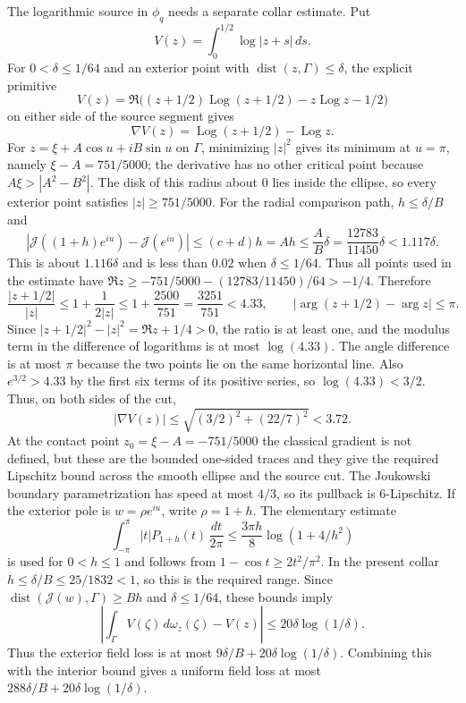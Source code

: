 The logarithmic source in $\phi_q$ needs a separate collar estimate.  Put
\[
 V(z)=\int_0^{1/2}\log|z+s|\,ds.
\]
For $0<\delta\le1/64$ and an exterior point with
$\operatorname{dist}(z,\Gamma)\le\delta$, the explicit primitive
\[
 V(z)=\Re\bigl((z+1/2)\operatorname{Log}(z+1/2)
              -z\operatorname{Log}z-1/2\bigr)
\]
on either side of the source segment gives
\[
 \nabla V(z)=\operatorname{Log}(z+1/2)-\operatorname{Log}z.
\]
For $z=\xi+A\cos u+iB\sin u$ on $\Gamma$, minimizing
$|z|^2$ gives its minimum at $u=\pi$, namely
$\xi-A=751/5000$; the derivative has no other critical point because
$A\xi>|A^2-B^2|$.  The disk of this radius about $0$ lies inside the ellipse,
so every exterior point satisfies $|z|\ge751/5000$.  For the radial
comparison path, $h\le\delta/B$ and
\[
 |\mathcal J((1+h)e^{iu})-\mathcal J(e^{iu})|
 \le(c+d)h=Ah\le\frac AB\delta
 =\frac{12783}{11450}\delta<1.117\delta.
\]
This is about $1.116\delta$ and is less than $0.02$ when
$\delta\le1/64$.  Thus all points used in the estimate have
$\Re z\ge-751/5000-(12783/11450)/64>-1/4$.  Therefore
\[
 \frac{|z+1/2|}{|z|}
 \le1+\frac1{2|z|}
 \le1+\frac{2500}{751}
 =\frac{3251}{751}<4.33,
 \qquad
 |\arg(z+1/2)-\arg z|\le\pi.
\]
Since $|z+1/2|^2-|z|^2=\Re z+1/4>0$, the ratio is at least one, and
the modulus term in the difference of logarithms is at most $\log(4.33)$.
The angle difference is at most $\pi$ because the two points lie on the
same horizontal line.  Also $e^{3/2}>4.33$ by the first six terms of its
positive series, so $\log(4.33)<3/2$.  Thus, on both sides of the cut,
\[
 |\nabla V(z)|
 \le\sqrt{(3/2)^2+(22/7)^2}<3.72.
\]
At the contact point $z_0=\xi-A=-751/5000$ the classical gradient is not
defined, but these are the bounded one-sided traces and they give the
required Lipschitz bound across the smooth ellipse and the source cut.  The
Joukowski boundary parametrization has speed at most $4/3$, so its
pullback is $6$-Lipschitz.  If the exterior pole is $w=\rho e^{iu}$, write
$\rho=1+h$.  The elementary estimate
\[
 \int_{-\pi}^{\pi}|t|P_{1+h}(t)\,\frac{dt}{2\pi}
 \le \frac{3\pi h}{8}\log(1+4/h^2)
\]
is used for $0<h\le1$ and follows from
$1-\cos t\ge2t^2/\pi^2$.  In the present collar
$h\le\delta/B\le25/1832<1$, so this is the required range.  Since
$\operatorname{dist}(\mathcal J(w),\Gamma)\ge Bh$ and $\delta\le1/64$,
these bounds imply
\[
 \left|\int_\Gamma V(\zeta)\,d\omega_z(\zeta)-V(z)\right|
 \le20\delta\log(1/\delta).
\]
Thus the exterior field loss is at most
$9\delta/B+20\delta\log(1/\delta)$.  Combining this with the interior
bound gives a uniform field loss at most
$288\delta/B+20\delta\log(1/\delta)$.

